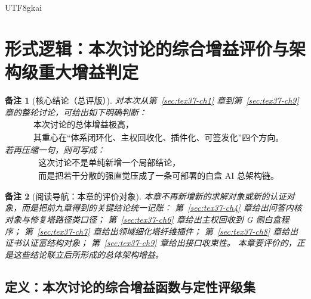 \documentclass[12pt]{article}
\newtheorem{remark}{备注}[section]
\begin{document}
\begin{CJK*}{UTF8}{gkai}
\clearpage

\section{形式逻辑：本次讨论的综合增益评价与架构级重大增益判定}
\label{sec:tex37-ch10}

\begin{remark}[核心结论（总评版）]
对本次从第~\ref{sec:tex37-ch1} 章到第~\ref{sec:tex37-ch9} 章的整轮讨论，可给出如下明确判断：
\[
  \boxed{
    \begin{aligned}
      &\text{本次讨论的总体增益极高，}\\
      &\text{其重心在“体系闭环化、主权回收化、插件化、可签发化”四个方向。}
    \end{aligned}
  }
\]
若再压缩一句，则可写成：
\[
  \boxed{
    \begin{aligned}
      &\text{这次讨论不是单纯新增一个局部结论，}\\
      &\text{而是把若干分散的强直觉压成了一条可部署的白盒 AI 总架构链。}
    \end{aligned}
  }
\]
\end{remark}

\begin{remark}[阅读导航：本章的评价对象]
本章不再新增新的求解对象或新的认证对象，而是把前九章得到的关键结论统一记账：
第~\ref{sec:tex37-ch4} 章给出问答内核对象与修复塔路径类口径；
第~\ref{sec:tex37-ch6} 章给出主权回收到 G 侧白盒程序；
第~\ref{sec:tex37-ch7} 章给出领域细化塔纤维插件；
第~\ref{sec:tex37-ch8} 章给出证书认证富结构对象；
第~\ref{sec:tex37-ch9} 章给出接口收束性。
本章要评价的，正是这些结论联立后所形成的总体架构增益。
\end{remark}

\subsection{定义：本次讨论的综合增益函数与定性评级集}
\label{subsec:tex37-ch10-definitions}


\end{CJK*}
\end{document}
